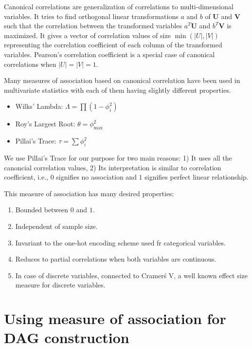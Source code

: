 \documentclass[letterpaper]{article} %
\begin{document}
Canonical correlations are generalization of correlations to multi-dimensional
variables. It tries to find orthogonal linear transformations $ a $ and $ b $
of $ \bm{U} $ and $ \bm{V} $ such that the correlation between the transformed
variables $ a^T \bm{U} $ and $ b^T \bm{V} $ is maximized. It gives a vector of
correlation values of size $ \min(\rvert U \rvert, \rvert V \rvert) $
representing the correlation coefficient of each column of the transformed
variables. Pearson's correlation coefficient is a special case of canonical
correlations when $ \rvert U \rvert = \rvert V \rvert = 1$.

Many measures of association based on canonical correlation have been used in
multivariate statistics with each of them having slightly different properties.
\begin{itemize}
	\item Wilks' Lambda: $ \Lambda = \prod (1 - \phi_i^2) $
	\item Roy's Largest Root: $ \theta = \phi_{\max}^2 $
	\item Pillai's Trace: $ \tau = \sum \phi_i^2 $
\end{itemize}

We use Pillai's Trace for our purpose for two main reasons: 1) It uses all the
canoncial correlation values, 2) Its interpretation is similar to correlation
coefficient, i.e., $ 0 $ signifies no association and $ 1 $ signifies perfect
linear relationship. 


This measure of association has many desired properties:

\begin{enumerate}
	\item Bounded between $ 0 $ and $ 1 $.
	\item Independent of sample size.
	\item Invariant to the one-hot encoding scheme used fr categorical variables.
	\item Reduces to partial correlations when both variables are continuous.
	\item In case of discrete variables, connected to Cramer\'s V, a well
		known effect size measure for discrete variables.
\end{enumerate}

\section{Using measure of association for DAG construction}
\label{sec:modification}
\end{document}
